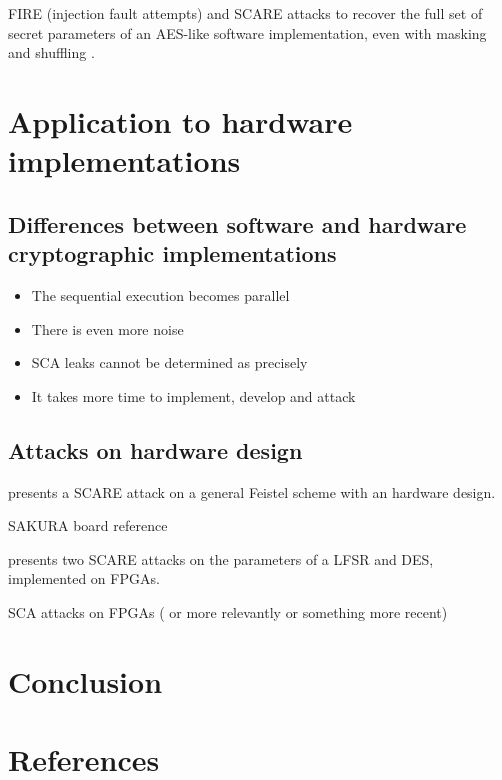 \documentclass[11pt]{sdm}
\begin{document}

FIRE (injection fault attempts) and SCARE attacks to recover the full set of secret parameters of an AES-like software implementation, even with masking and shuffling \parencite{Clavier_Isorez_Marion_Wurcker_2015}.

\section{Application to hardware implementations}

\subsection{Differences between software and hardware cryptographic implementations}

\begin{itemize}
    \item The sequential execution becomes parallel
    \item There is even more noise
    \item SCA leaks cannot be determined as precisely
    \item It takes more time to implement, develop and attack
\end{itemize}

\subsection{Attacks on hardware design}

\parencite{Réal_Dubois_Guilloux_Valette_Drissi_2008} presents a SCARE attack on a general Feistel scheme with an hardware design.

SAKURA board reference

\parencite{Guilley_Sauvage_Micolod_Réal_Valette_2010} presents two SCARE attacks on the parameters of a LFSR and DES, implemented on FPGAs.

SCA attacks on FPGAs (\parencite{Peeters_Standaert_Donckers_Quisquater_2005} or more relevantly \parencite{Standaert_Ors_Preneel_2004} or something more recent)


\section{Conclusion}

\section*{References}

\printbibliography
\end{document}

